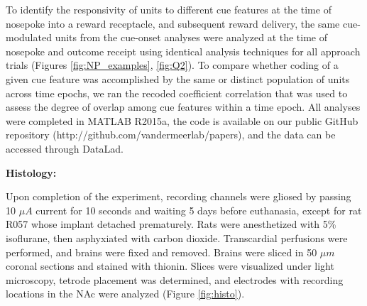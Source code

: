 \documentclass[11pt]{article}
\providecommand{\DIFadd}[1]{{\protect\color{red} \sf #1}} %
\providecommand{\DIFdel}[1]{} %
\providecommand{\DIFaddbegin}{} %
\providecommand{\DIFaddend}{} %
\providecommand{\DIFdelbegin}{} %
\providecommand{\DIFdelend}{} %
\newcommand{\DIFscaledelfig}{0.5}
\newlength{\DIFdelgraphicswidth} %
\newlength{\DIFdelgraphicsheight} %
\newcommand{\DIFaddincludegraphics}[2][]{{\color{red}\fbox{\DIFOincludegraphics[#1]{#2}}}} %
\newcommand{\DIFdelincludegraphics}[2][]{%
\sbox{\DIFdelgraphicsbox}{\DIFOincludegraphics[#1]{#2}}%
\settoboxwidth{\DIFdelgraphicswidth}{\DIFdelgraphicsbox} %
\settoboxtotalheight{\DIFdelgraphicsheight}{\DIFdelgraphicsbox} %
\scalebox{\DIFscaledelfig}{%
\parbox[b]{\DIFdelgraphicswidth}{\usebox{\DIFdelgraphicsbox}\\[-\baselineskip] \rule{\DIFdelgraphicswidth}{0em}}\llap{\resizebox{\DIFdelgraphicswidth}{\DIFdelgraphicsheight}{%
\setlength{\unitlength}{\DIFdelgraphicswidth}%
\begin{picture}(1,1)%
\thicklines\linethickness{2pt} %
{\color[rgb]{1,0,0}\put(0,0){\framebox(1,1){}}}%
{\color[rgb]{1,0,0}\put(0,0){\line( 1,1){1}}}%
{\color[rgb]{1,0,0}\put(0,1){\line(1,-1){1}}}%
\end{picture}%
}\hspace*{3pt}}} %
} %
\DeclareRobustCommand{\DIFaddbegin}{\DIFOaddbegin \let\includegraphics\DIFaddincludegraphics} %
\DeclareRobustCommand{\DIFaddend}{\DIFOaddend \let\includegraphics\DIFOincludegraphics} %
\DeclareRobustCommand{\DIFdelbegin}{\DIFOdelbegin \let\includegraphics\DIFdelincludegraphics} %
\DeclareRobustCommand{\DIFdelend}{\DIFOaddend \let\includegraphics\DIFOincludegraphics} %
\begin{document}
To identify the responsivity of units to different cue features at the time of \DIFdelbegin \DIFdel{a }\DIFdelend nosepoke into a reward receptacle, and subsequent reward delivery, the same \DIFdelbegin \DIFdel{cue-responsive }\DIFdelend \DIFaddbegin \DIFadd{cue-modulated }\DIFaddend units from the cue-onset analyses were analyzed at the time of nosepoke and outcome receipt using identical analysis techniques \DIFaddbegin \DIFadd{for all approach trials }\DIFaddend (Figures \ref{fig:NP_examples}, \DIFdelbegin \DIFdel{\ref{fig:NP_GLM}, \ref{fig:NP_pop}, and \ref{fig:NP_tiling}). }%
\DIFdel{Given that some of our analyses compare firing rates across time ,
particularly comparisons across blocks, we sought to exclude units
with unstable firing rates that would generate spurious results
reflecting a drift in firing rate over time unrelated to our task. To
do this we ran a Mann-Whitney U test comparing the cue-evoked firing
rates for the first and second half of trials within a block, and
excluded 99 of 443 units from analysis that showed a significant change for
either block, leaving 344 units for further analyses}\DIFdelend \DIFaddbegin \DIFadd{\ref{fig:Q2}). To compare whether coding of a given cue feature was accomplished by the same or distinct population of units across time epochs, we ran the recoded coefficient correlation that was used to assess the degree of overlap among cue features within a time epoch}\DIFaddend . All analyses were completed in MATLAB R2015a, the code is available on our public GitHub repository (http://github.com/vandermeerlab/papers), and the data can be accessed through DataLad.

{\bf Histology:}

Upon completion of the experiment, recording channels were gliosed by passing 10 $\mu A$ current for 10 seconds and waiting 5 days before euthanasia, except for rat R057 whose implant detached prematurely. Rats were anesthetized with 5\%
isoflurane, then asphyxiated with carbon dioxide. Transcardial
perfusions were performed, and brains were fixed and removed. Brains
were sliced in 50 $\mu m$ coronal sections and stained with
thionin. Slices were visualized under light microscopy, tetrode
placement was determined, and electrodes with recording locations in
the NAc were analyzed (Figure \ref{fig:histo}).
\end{document}
